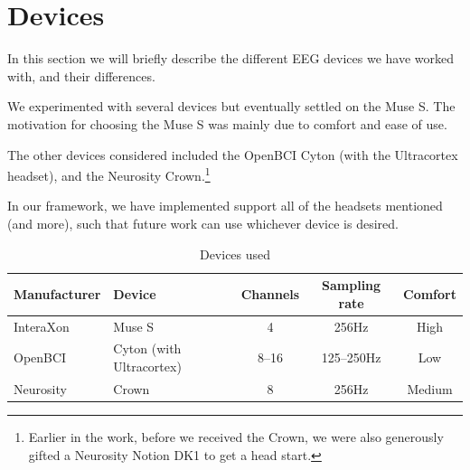 \section{Devices}
    
    In this section we will briefly describe the different EEG devices we have worked with, and their differences.

    We experimented with several devices but eventually settled on the Muse S. The motivation for choosing the Muse S was mainly due to comfort and ease of use. 

    The other devices considered included the OpenBCI Cyton (with the Ultracortex headset), and the Neurosity Crown.\footnote{Earlier in the work, before we received the Crown, we were also generously gifted a Neurosity Notion DK1 to get a head start.} 

    In our framework, we have implemented support all of the headsets mentioned (and more), such that future work can use whichever device is desired.

    \vspace{0.5cm}

    \begin{table}[H]
        \centering
        \begin{tabular}{llccc}
            \toprule
            Manufacturer
            & Device
            & Channels
            & Sampling rate
            & Comfort
            \\
            \midrule
            InteraXon
            & Muse S
            & 4
            & 256Hz
            & High \\
         OpenBCI
            & Cyton (with Ultracortex)
            & 8--16
            & 125--250Hz
            & Low \\
          Neurosity
            & Crown
            & 8
            & 256Hz
            & Medium \\
            \bottomrule
        \end{tabular}
        \caption{Devices used}\label{table:devices}
    \end{table}

    \vspace{0.5cm}

